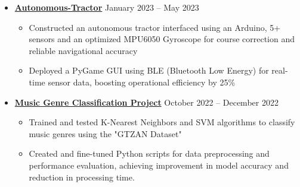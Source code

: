 \documentclass[letterpaper,11pt]{article}
\begin{document}
\vspace{-1\topsep} %
\vspace{-0.1\topsep} %


\begin{itemize}[leftmargin=0mm, label={}, itemsep=0pt]
\item \href{https://github.com/rm1738/Autonomous_Tractor}{\textbf{Autonomous-Tractor}} \hfill {January 2023 -- May 2023} \\
\vspace{0\topsep} %
\vspace{-\partopsep} %
\vspace{-\baselineskip} %
\begin{itemize}[leftmargin=5mm, itemsep=0pt, topsep=0pt, parsep=0pt, label={\textbullet}]
  \item \small  Constructed an autonomous tractor interfaced using an Arduino, 5+ sensors and an optimized MPU6050 Gyroscope for course correction and reliable navigational accuracy
  \item \small Deployed a PyGame GUI using BLE (Bluetooth Low Energy) for real-time sensor data, boosting operational efficiency by 25\%
\end{itemize}
\vspace{-\parsep} %
\end{itemize}

\vspace{-0.5\topsep} %

\begin{itemize}[leftmargin=0mm, label={}, itemsep=0pt]
\item \href{https://github.com/rm1738/Classifcation_of_Music_Genre/tree/main}{\textbf{Music Genre Classification Project}} \hfill {October 2022 -- December 2022} \\
\vspace{0\topsep} %
\vspace{-\partopsep} %
\vspace{-\baselineskip} %
\begin{itemize}[leftmargin=5mm, itemsep=0pt, topsep=0pt, parsep=0pt, label={\textbullet}]
  \item \small Trained and tested K-Nearest Neighbors and SVM algorithms to classify music genres using the "GTZAN Dataset"
  \item \small Created and fine-tuned Python scripts for data preprocessing and performance evaluation, achieving improvement in model accuracy and  reduction in processing time.
\end{itemize}
\vspace{-\parsep} %
\end{itemize}
\end{document}
